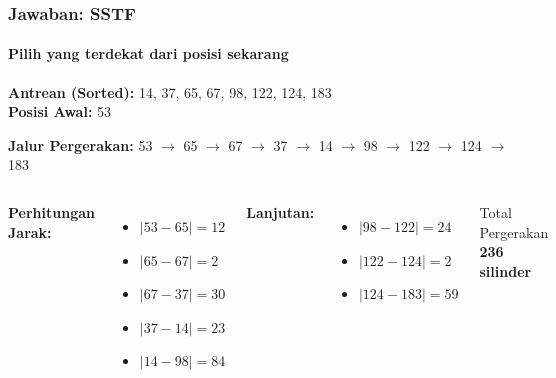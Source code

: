 \documentclass[t,aspectratio=169,xcolor=dvipsnames]{beamer}
\begin{document}
\begin{frame}
    \frametitle{Jawaban: SSTF}
    \framesubtitle{Pilih yang terdekat dari posisi sekarang}
    \small
    \textbf{Antrean (Sorted):} 14, 37, 65, 67, 98, 122, 124, 183\\
    \textbf{Posisi Awal:} 53
    
    \vspace{0.3cm}
    \textbf{Jalur Pergerakan:}
    53 $\rightarrow$ 65 $\rightarrow$ 67 $\rightarrow$ 37 $\rightarrow$ 14 $\rightarrow$ 98 $\rightarrow$ 122 $\rightarrow$ 124 $\rightarrow$ 183
    
    \vspace{0.3cm}
    \begin{columns}[T]
        \textbf{Perhitungan Jarak:}
        \begin{itemize}
            \item $|53 - 65| = 12$
            \item $|65 - 67| = 2$
            \item $|67 - 37| = 30$
            \item $|37 - 14| = 23$
            \item $|14 - 98| = 84$
        \end{itemize}
        
        \textbf{Lanjutan:}
        \begin{itemize}
            \item $|98 - 122| = 24$
            \item $|122 - 124| = 2$
            \item $|124 - 183| = 59$
        \end{itemize}
        
        \vspace{0.3cm}
        \begin{exampleblock}{Total Pergerakan}
            \textbf{236 silinder}
        \end{exampleblock}
    \end{columns}
\end{frame}
\end{document}
